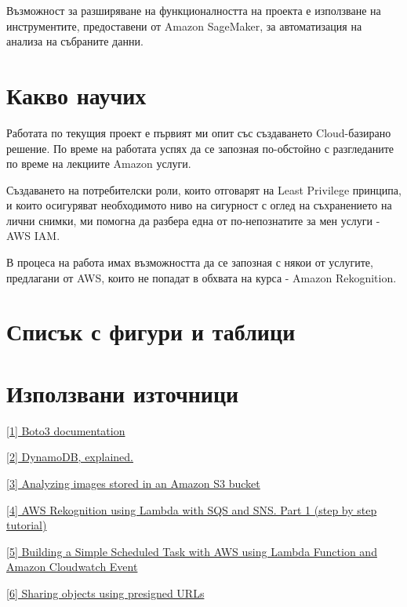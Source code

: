 \documentclass[12pt]{article}
\begin{document}
Възможност за разширяване на функционалността на проекта е използване на инструментите, предоставени от Amazon SageMaker, за автоматизация на анализа на събраните данни.

\medskip

\clearpage
\pagebreak

\section{Какво научих}

\hspace{\parindent}Работата по текущия проект е първият ми опит със създаването Cloud-базирано решение. По време на работата успях да се запозная по-обстойно с разгледаните по време на лекциите Amazon услуги.

Създаването на потребителски роли, които отговарят на Least Privilege принципа, и които осигуряват необходимото ниво на сигурност с оглед на съхранението на лични снимки, ми помогна да разбера една от по-непознатите за мен услуги - AWS IAM.

В процеса на работа имах възможността да се запозная с някои от услугите, предлагани от AWS, които не попадат в обхвата на курса - Amazon Rekognition.


\clearpage
\pagebreak

\section{Списък с фигури и таблици}

\listoffigures

\section{Използвани източници}

\noindent\href{https://boto3.amazonaws.com/v1/documentation/api/latest/index.html}{[1] Boto3 documentation}

\noindent\href{https://www.dynamodbguide.com/}{[2] DynamoDB, explained.}

\noindent\href{https://docs.aws.amazon.com/rekognition/latest/dg/images-s3.html}{[3] Analyzing images stored in an Amazon S3 bucket}

\noindent\href{https://awstip.com/aws-rekognition-using-lambda-with-sqs-and-sns-part-1-ca66c37dad7e}{[4] AWS Rekognition using Lambda with SQS and SNS. Part 1 (step by step tutorial)}

\noindent\href{https://medium.com/thelorry-product-tech-data/building-a-simple-scheduled-task-with-aws-using-lambda-function-and-amazon-cloudwatch-event-e92e5e2418cf}{[5] Building a Simple Scheduled Task with AWS using Lambda Function and Amazon Cloudwatch Event}

\noindent\href{https://docs.aws.amazon.com/AmazonS3/latest/userguide/ShareObjectPreSignedURL.html}{[6] Sharing objects using presigned URLs}
 
\medskip
\end{document}
